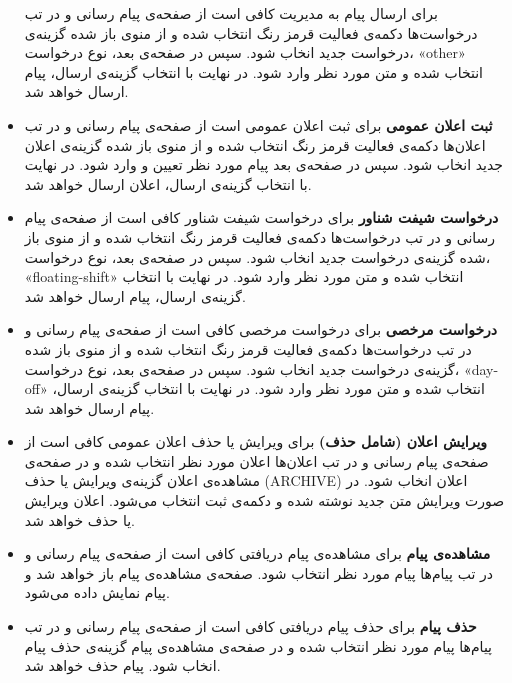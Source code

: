 \begin{itemize}
برای ارسال پیام به مدیریت کافی است از صفحه‌ی پیام رسانی و در تب درخواست‌ها دکمه‌ی فعالیت قرمز رنگ انتخاب شده و از منوی باز شده گزینه‌ی درخواست جدید انخاب شود. سپس در صفحه‌ی بعد، نوع درخواست، «other» انتخاب شده و متن مورد نظر وارد شود. در نهایت با انتخاب گزینه‌ی ارسال، پیام ارسال خواهد شد.
\item \textbf{ثبت اعلان عمومی} \newline
برای ثبت اعلان عمومی است از صفحه‌ی پیام رسانی و در تب اعلان‌ها دکمه‌ی فعالیت قرمز رنگ انتخاب شده و از منوی باز شده گزینه‌ی اعلان جدید انخاب شود. سپس در صفحه‌ی بعد پیام مورد نظر تعیین و وارد شود. در نهایت با انتخاب گزینه‌ی ارسال، اعلان ارسال خواهد شد.
\item \textbf{درخواست شیفت شناور} \newline
برای درخواست شیفت شناور کافی است از صفحه‌ی پیام رسانی و در تب درخواست‌ها دکمه‌ی فعالیت قرمز رنگ انتخاب شده و از منوی باز شده گزینه‌ی درخواست جدید انخاب شود. سپس در صفحه‌ی بعد، نوع درخواست، «floating-shift» انتخاب شده و متن مورد نظر وارد شود. در نهایت با انتخاب گزینه‌ی ارسال، پیام ارسال خواهد شد.
\item \textbf{درخواست مرخصی} \newline
برای درخواست مرخصی کافی است از صفحه‌ی پیام رسانی و در تب درخواست‌ها دکمه‌ی فعالیت قرمز رنگ انتخاب شده و از منوی باز شده گزینه‌ی درخواست جدید انخاب شود. سپس در صفحه‌ی بعد، نوع درخواست، «day-off» انتخاب شده و متن مورد نظر وارد شود. در نهایت با انتخاب گزینه‌ی ارسال، پیام ارسال خواهد شد.
\item \textbf{ویرایش اعلان (شامل حذف)} \newline
برای ویرایش یا حذف اعلان عمومی کافی است از صفحه‌ی پیام رسانی و در تب اعلان‌ها اعلان مورد نظر انتخاب شده و در صفحه‌ی مشاهده‌ی اعلان  گزینه‌ی ویرایش یا حذف (ARCHIVE) اعلان انخاب شود. در صورت ویرایش متن جدید نوشته شده و دکمه‌ی ثبت انتخاب می‌شود. اعلان ویرایش یا حذف خواهد شد.
\item \textbf{مشاهده‌ی پیام} \newline
برای مشاهده‌ی پیام دریافتی کافی است از صفحه‌ی پیام رسانی و در تب پیام‌ها پیام مورد نظر انتخاب شود. صفحه‌ی مشاهده‌ی پیام باز خواهد شد و پیام نمایش داده می‌شود.

\item \textbf{حذف پیام} \newline
برای حذف پیام دریافتی کافی است از صفحه‌ی پیام رسانی و در تب پیام‌ها پیام مورد نظر انتخاب شده و در صفحه‌ی مشاهده‌ی پیام  گزینه‌ی حذف پیام انخاب شود. پیام حذف خواهد شد.
\end{itemize}